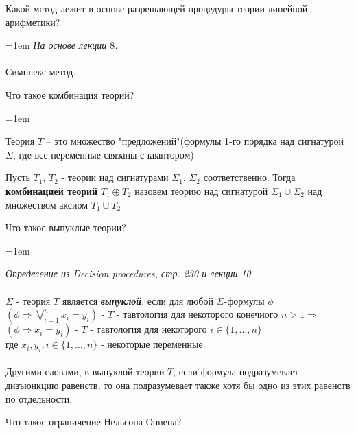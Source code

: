 \documentclass[12pt]{extreport}
\theoremstyle{definiton}
\theoremstyle{definition}
\theoremstyle{definition}
\newcommand{\solution}[2][\color{myblue}Ответ]{
\medskip
	\noindent{\bfseries #1 }{{\color{myblue}\bfseries #2:}}
}
\newenvironment{blockquote}{%
  \par%
  \medskip
  \leftskip=1em%
  \noindent}{%
  \par\medskip}
\begin{document}
\Pr[\textcolor{mygreen}{Саит, DONE}] Какой метод лежит в основе разрешающей процедуры теории линейной арифметики?

\solution{16}
\begin{blockquote}
{\color{myblue}
\noindent \textcolor{mypurpur}{\textit{На основе лекции $8$.}}\\			
\\
\noindent Симплекс метод.
}
\end{blockquote}

\Pr[Алтана] Что такое комбинация теорий?
			
\solution{17}
\begin{blockquote}
{\color{myblue}
\noindent 

Теория $T$ -- это множество "предложений"(формулы 1-го порядка над сигнатурой $\Sigma$, где все переменные связаны с квантором)

Пусть $T_1$, $T_2$ - теории над сигнатурами $\Sigma_1$, $\Sigma_2$ соответственно. Тогда \textbf{комбинацией теорий} $T_1 \oplus T_2$ назовем теорию над сигнатурой $\Sigma_1\cup\Sigma_2$ над множеством аксиом $T_1\cup T_2$
}
\end{blockquote}

\Pr[\textcolor{mygreen}{Каринэ, DONE}] Что такое выпуклые теории?
			
\solution{18}
\begin{blockquote}
{\color{myblue}
\noindent  \textcolor{mypurpur}{\textit{ Определение из Decision procedures, стр. 230 и лекции 10}}\\ \\
\(\Sigma\) - теория \(T\) является \textbf{\textit{выпуклой}}, если для любой \(\Sigma\)-формулы \(\phi\) \\
\((\phi \Rightarrow \bigvee\limits_{i=1}^{n} x_i=y_i)\) - \(T\) - тавтология для некоторого конечного \(n>1\Rightarrow\) \\
\((\phi \Rightarrow x_i=y_i)\) - \(T\) - тавтология для некоторого \(i \in \{1,\dots,n\}\) \\
где \(x_i,y_i, i\in\{1,\dots,n\}\) - некоторые переменные. \\ \\
Другими словами, в выпуклой теории \(T\), если формула подразумевает дизъюнкцию равенств, то она 
подразумевает также хотя бы одно из этих равенств по отдельности.

}
\end{blockquote}

\Pr[Паша] Что такое ограничение Нельсона-Оппена?
			
\end{document}
